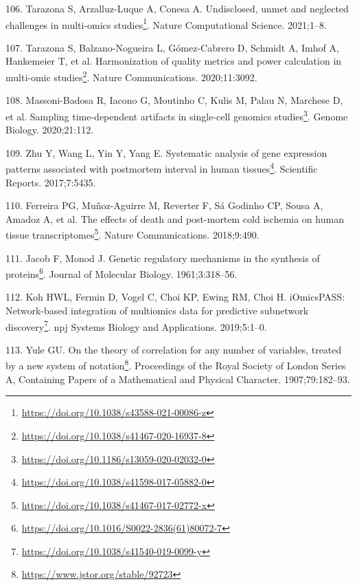 \documentclass[
  12pt,
  a4paper,
  twoside,
  openright]{book}
\DeclareRobustCommand{\href}[2]{#2\footnote{\url{#1}}}
\newlength{\cslhangindent}
\newlength{\cslentryspacingunit} %
\newenvironment{CSLReferences}[2] %
 {%
  \setlength{\parindent}{0pt}
  \ifodd #1
  \let\oldpar\par
  \def\par{\hangindent=\cslhangindent\oldpar}
  \fi
  \setlength{\parskip}{#2\cslentryspacingunit}
 }%
 {}
\begin{document}
\begin{CSLReferences}{0}{0}
\leavevmode{}%
106. Tarazona S, Arzalluz-Luque A, Conesa A. \href{https://doi.org/10.1038/s43588-021-00086-z}{Undisclosed, unmet and neglected challenges in multi-omics studies}. Nature Computational Science. 2021;1--8.

\leavevmode{}%
107. Tarazona S, Balzano-Nogueira L, Gómez-Cabrero D, Schmidt A, Imhof A, Hankemeier T, et al. \href{https://doi.org/10.1038/s41467-020-16937-8}{Harmonization of quality metrics and power calculation in multi-omic studies}. Nature Communications. 2020;11:3092.

\leavevmode{}%
108. Massoni-Badosa R, Iacono G, Moutinho C, Kulis M, Palau N, Marchese D, et al. \href{https://doi.org/10.1186/s13059-020-02032-0}{Sampling time-dependent artifacts in single-cell genomics studies}. Genome Biology. 2020;21:112.

\leavevmode{}%
109. Zhu Y, Wang L, Yin Y, Yang E. \href{https://doi.org/10.1038/s41598-017-05882-0}{Systematic analysis of gene expression patterns associated with postmortem interval in human tissues}. Scientific Reports. 2017;7:5435.

\leavevmode{}%
110. Ferreira PG, Muñoz-Aguirre M, Reverter F, Sá Godinho CP, Sousa A, Amadoz A, et al. \href{https://doi.org/10.1038/s41467-017-02772-x}{The effects of death and post-mortem cold ischemia on human tissue transcriptomes}. Nature Communications. 2018;9:490.

\leavevmode{}%
111. Jacob F, Monod J. \href{https://doi.org/10.1016/S0022-2836(61)80072-7}{Genetic regulatory mechanisms in the synthesis of proteins}. Journal of Molecular Biology. 1961;3:318--56.

\leavevmode{}%
112. Koh HWL, Fermin D, Vogel C, Choi KP, Ewing RM, Choi H. \href{https://doi.org/10.1038/s41540-019-0099-y}{{iOmicsPASS}: Network-based integration of multiomics data for predictive subnetwork discovery}. npj Systems Biology and Applications. 2019;5:1--0.

\leavevmode{}%
113. Yule GU. \href{https://www.jstor.org/stable/92723}{On the theory of correlation for any number of variables, treated by a new system of notation}. Proceedings of the Royal Society of London Series A, Containing Papers of a Mathematical and Physical Character. 1907;79:182--93.


\end{CSLReferences}
\end{document}

